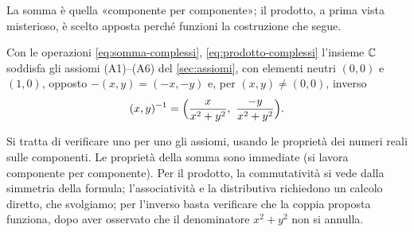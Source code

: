La somma è quella «componente per componente»; il prodotto, a prima vista misterioso, è
scelto apposta perché funzioni la costruzione che segue.

\begin{teorema}[$\C$ è un campo]\label{teo:C-campo}
Con le operazioni \eqref{eq:somma-complessi}, \eqref{eq:prodotto-complessi} l'insieme
$\C$ soddisfa gli assiomi (A1)--(A6) del \cref{sec:assiomi}, con elementi neutri
$(0,0)$ e $(1,0)$, opposto $-(x,y)=(-x,-y)$ e, per $(x,y)\neq(0,0)$, inverso
\begin{equation}\label{eq:inverso-complesso}
  (x,y)^{-1}=\Bigl(\frac{x}{x^{2}+y^{2}},\ \frac{-y}{x^{2}+y^{2}}\Bigr).
\end{equation}
\end{teorema}

\begin{schema}
\end{schema}

\begin{strategia}
Si tratta di verificare uno per uno gli assiomi, usando le proprietà dei numeri reali
sulle componenti. Le proprietà della somma sono immediate (si lavora componente per
componente). Per il prodotto, la commutatività si vede dalla simmetria della formula;
l'associatività e la distributiva richiedono un calcolo diretto, che svolgiamo; per
l'inverso basta verificare che la coppia proposta funziona, dopo aver osservato che il
denominatore $x^{2}+y^{2}$ non si annulla.
\end{strategia}

